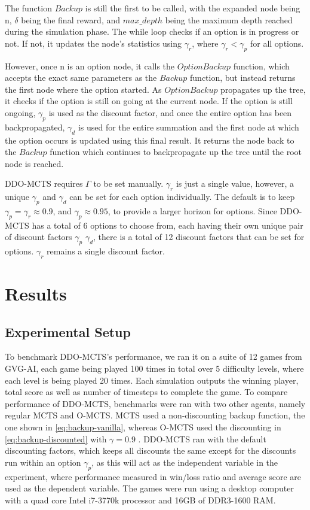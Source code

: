 \documentclass[12pt,a4paper]{article}
\begin{document}
\begin{multicols}{2}
The function $Backup$ is still the first to be called, with the expanded node being n, $\delta$ being the final reward, and $max\_depth$ being the maximum depth reached during the simulation phase. The while loop checks if an option is in progress or not. If not, it updates the node's statistics using $\gamma_{r}$, where $\gamma_{r} < \gamma_{p}$ for all options.

However, once n is an option node, it calls the $OptionBackup$ function, which accepts the exact same parameters as the $Backup$ function, but instead returns the first node where the option started. As $OptionBackup$ propagates up the tree, it checks if the option is still on going at the current node. If the option is still ongoing, $\gamma_{p}$ is used as the discount factor, and once the entire option has been backpropagated, $\gamma_{d}$ is used for the entire summation and the first node at which the option occurs is updated using this final result. It returns the node back to the $Backup$ function which continues to backpropagate up the tree until the root node is reached.

DDO-MCTS requires $\Gamma$ to be set manually. $\gamma_{r}$ is just a single value, however, a unique $\gamma_{p}$ and $\gamma_{d}$ can be set for each option individually. The default is to keep $\gamma_{p} = \gamma_{r} \approx 0.9$, and $\gamma_{p} \approx 0.95$, to provide a larger horizon for options. Since DDO-MCTS has a total of 6 options to choose from, each having their own unique pair of discount factors $\gamma_{p}$ $\gamma_{d}$, there is a total of 12 discount factors that can be set for options. $\gamma_{r}$ remains a single discount factor.

\section{Results}
\subsection{Experimental Setup}
To benchmark DDO-MCTS's performance, we ran it on a suite of 12 games from GVG-AI, each game being played 100 times in total over 5 difficulty levels, where each level is being played 20 times. Each simulation outputs the winning player, total score as well as number of timesteps to complete the game. To compare performance of DDO-MCTS, benchmarks were ran with two other agents, namely regular MCTS and O-MCTS. MCTS used a non-discounting backup function, the one shown in \eqref{eq:backup-vanilla}, whereas O-MCTS used the discounting in \eqref{eq:backup-discounted} with $\gamma = 0.9$ . DDO-MCTS ran with the default discounting factors, which keeps all discounts the same except for the discounts run within an option $\gamma_{p}$, as this will act as the independent variable in the experiment, where performance measured in win/loss ratio and average score are used as the dependent variable.
The games were run using a desktop computer with a quad core Intel i7-3770k processor and 16GB of DDR3-1600 RAM.


\end{multicols}
\end{document}
